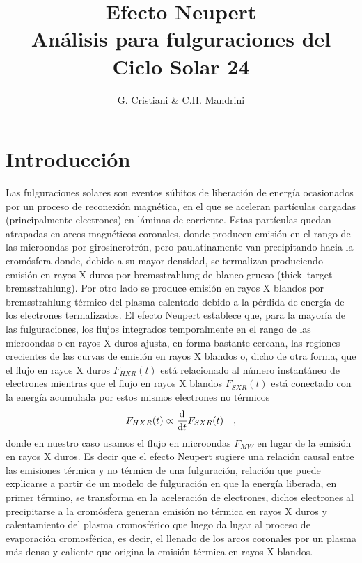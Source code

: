 \documentclass[baaa]{baaa}
\title{Efecto Neupert\\ Análisis para fulguraciones del Ciclo Solar 24}
\author{G. Cristiani\inst{1} \& C.H. Mandrini\inst{1}}
\institute{
Instituto de Astronom{\'\i}a y F{\'\i}sica del Espacio, CONICET--UBA, Argentina
}
\begin{document}
\maketitle

\section{Introducci\'on}\label{S_intro}
Las fulguraciones solares son eventos s\'ubitos de liberaci\'on de energ\'ia ocasionados 
por un proceso de reconexi\'on magn\'etica, en el que se aceleran part\'iculas cargadas 
(principalmente electrones) en l\'aminas de corriente. Estas part\'iculas 
quedan atrapadas en arcos magn\'eticos coronales, donde producen emisi\'on en el rango 
de las microondas por girosincrotr\'on, pero paulatinamente van precipitando 
hacia la crom\'osfera donde, debido a su mayor densidad, se termalizan produciendo 
emisi\'on en rayos X duros por bremsstrahlung de blanco grueso (thick--target bremsstrahlung). Por otro lado se produce 
emisi\'on en rayos X blandos por bremsstrahlung t\'ermico del plasma calentado debido a 
la p\'erdida de energ\'ia de los electrones termalizados. El efecto Neupert \citep{Neupert:1968,Hudson:1991} establece que, 
para la mayor\'ia de las fulguraciones, los flujos integrados temporalmente en el rango 
de las microondas o en rayos X duros ajusta, en forma bastante cercana, las regiones 
crecientes de las curvas de emisi\'on en rayos X blandos o, dicho de otra forma, que el flujo en rayos X 
duros $F_{HXR}(t)$ est\'a relacionado al n\'umero instant\'aneo de electrones mientras que el flujo en rayos X blandos 
$F_{SXR}(t)$ est\'a conectado con la energ\'ia acumulada por estos mismos electrones no t\'ermicos
\begin{equation}F_{HXR}(t)\propto \frac{{\rm d}}{{\rm d}t}F_{SXR}(t)\quad,\end{equation}
donde en nuestro caso usamos el flujo en microondas $F_{MW}$ en lugar de la emisi\'on en rayos X duros. 
Es decir que el efecto Neupert sugiere una relaci\'on causal entre las emisiones t\'ermica 
y no t\'ermica de una fulguraci\'on, relaci\'on que puede explicarse a partir de un mode\-lo de 
fulguraci\'on en que la energ\'ia liberada, en primer t\'ermino, se transforma  en la aceleraci\'on 
de electrones, dichos electrones al precipitarse a la crom\'osfera generan emisi\'on no t\'ermica en rayos X duros y 
calentamiento del plasma cromosf\'erico que luego da lugar al proceso de evaporaci\'on cromosf\'erica, es decir, el llenado de los arcos coronales por un plasma m\'as denso y caliente que origina la emisi\'on t\'ermica en rayos X 
blandos.
\end{document}
